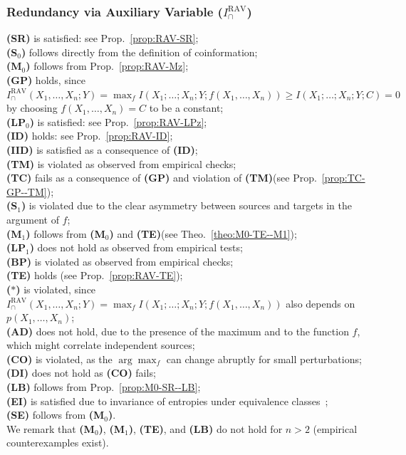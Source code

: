 \documentclass{article}
\newcommand{\ts}[1]{\ensuremath{_{\text{#1}}}}
\newcommand{\Xs}{X_1,\ldots,X_n}
\newcommand{\SR}{\textbf{(SR)}\xspace} %
\newcommand{\Sz}{\textbf{(S\ts{0})}\xspace} %
\newcommand{\Mz}{\textbf{(M\ts{0})}\xspace} %
\newcommand{\GP}{\textbf{(GP)}\xspace} %
\newcommand{\LPz}{\textbf{(LP\ts{0})}\xspace} %
\newcommand{\ID}{\textbf{(ID)}\xspace} %
\newcommand{\IID}{\textbf{(IID)}\xspace} %
\newcommand{\TM}{\textbf{(TM)}\xspace} %
\newcommand{\TC}{\textbf{(TC)}\xspace} %
\newcommand{\So}{\textbf{(S\ts{1})}\xspace} %
\newcommand{\Mo}{\textbf{(M\ts{1})}\xspace} %
\newcommand{\LPo}{\textbf{(LP\ts{1})}\xspace} %
\newcommand{\BP}{\textbf{(BP)}\xspace} %
\newcommand{\TE}{\textbf{(TE)}\xspace} %
\newcommand{\AST}{\textbf{($\boldsymbol{\ast}$)}\xspace} %
\newcommand{\AD}{\textbf{(AD)}\xspace} %
\newcommand{\CO}{\textbf{(CO)}\xspace} %
\newcommand{\LB}{\textbf{(LB)}\xspace} %
\newcommand{\EI}{\textbf{(EI)}\xspace} %
\newcommand{\SE}{\textbf{(SE)}\xspace} %
\newcommand{\DI}{\textbf{(DI)}\xspace}
\newcommand{\IRAV}{\ensuremath{I_\cap^{\text{RAV}}}\xspace}
\begin{document}
\subsubsection*{Redundancy via Auxiliary Variable ($\IRAV$)}
    \SR is satisfied: see Prop.~\ref{prop:RAV-SR}; \\
    \Sz follows directly from the definition of coinformation; \\
    \Mz follows from Prop.~\ref{prop:RAV-Mz}; \\
    \GP holds, since $\IRAV(\Xs;Y)= \max_f I(X_1;\ldots;X_n;Y;f(\Xs))\ge I(X_1;\ldots;X_n;Y;C)=0$ by choosing $f(\Xs)=C$ to be a constant; \\
    \LPz is satisfied: see Prop.~\ref{prop:RAV-LPz}; \\
    \ID holds: see Prop.~\ref{prop:RAV-ID}; \\
    \IID is satisfied as a consequence of \ID; \\
    \TM is violated as observed from empirical checks; \\
    \TC fails as a consequence of \GP and violation of \TM (see Prop.~\ref{prop:TC-GP--TM}); \\
    \So is violated due to the clear asymmetry between sources and targets in the argument of $f$; \\
    \Mo follows from \Mz and \TE (see Theo.~\ref{theo:M0-TE--M1}); \\
    \LPo does not hold as observed from empirical tests; \\
    \BP is violated as observed from empirical checks; \\
    \TE holds (see Prop.~\ref{prop:RAV-TE}); \\
    \AST is violated, since $\IRAV(\Xs;Y)=\max_f I(X_1;\ldots;X_n;Y;f(\Xs))$ also depends on $p(\Xs)$; \\ 
    \AD does not hold, due to the presence of the maximum and to the function $f$, which might correlate independent sources; \\
    \CO is violated, as the $\arg \max_f$ can change abruptly for small perturbations; \\
    \DI does not hold as \CO fails; \\
    \LB follows from Prop.~\ref{prop:M0-SR--LB}; \\
    \EI is satisfied due to invariance of entropies under equivalence classes~\cite{li2011connection}; \\
    \SE follows from \Mz. \\
    We remark that \Mz, \Mo, \TE, and \LB do not hold for $n>2$ (empirical counterexamples exist).
\end{document}
